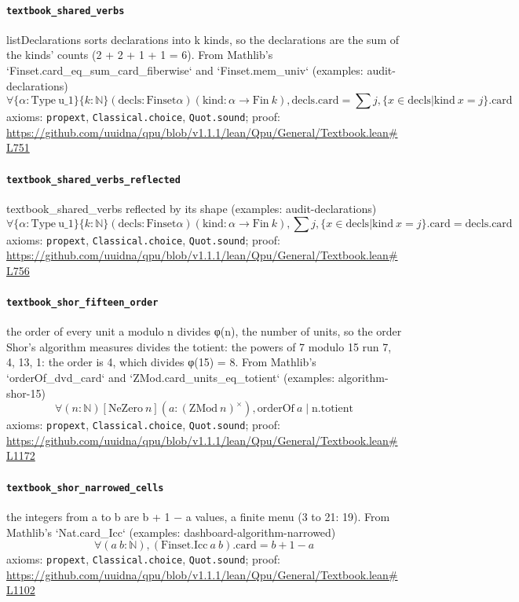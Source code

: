 \documentclass[11pt]{article}
\begin{document}
\paragraph{\texttt{textbook\_shared\_verbs}}
listDeclarations sorts declarations into k kinds, so the declarations are the sum of the kinds' counts (2 + 2 + 1 + 1 = 6). From Mathlib's `Finset.card\_eq\_sum\_card\_fiberwise` and `Finset.mem\_univ` (examples: audit-declarations)
\[ \forall \{\alpha : \mathrm{Type}\ \mathrm{u\_1}\} \{k : \mathbb{N}\} (\mathrm{decls} : \mathrm{Finset} \alpha ) (\mathrm{kind} : \alpha \to \mathrm{Fin}\ k), \mathrm{decls.card} = \sum j, \{x \in \mathrm{decls} | \mathrm{kind}\ x = j\}\mathrm{.card} \]
\noindent axioms: \texttt{propext}, \texttt{Classical.choice}, \texttt{Quot.sound}; proof: \url{https://github.com/uuidna/qpu/blob/v1.1.1/lean/Qpu/General/Textbook.lean\#L751}

\paragraph{\texttt{textbook\_shared\_verbs\_reflected}}
textbook\_shared\_verbs reflected by its shape (examples: audit-declarations)
\[ \forall \{\alpha : \mathrm{Type}\ \mathrm{u\_1}\} \{k : \mathbb{N}\} (\mathrm{decls} : \mathrm{Finset} \alpha ) (\mathrm{kind} : \alpha \to \mathrm{Fin}\ k), \sum j, \{x \in \mathrm{decls} | \mathrm{kind}\ x = j\}\mathrm{.card} = \mathrm{decls.card} \]
\noindent axioms: \texttt{propext}, \texttt{Classical.choice}, \texttt{Quot.sound}; proof: \url{https://github.com/uuidna/qpu/blob/v1.1.1/lean/Qpu/General/Textbook.lean\#L756}

\paragraph{\texttt{textbook\_shor\_fifteen\_order}}
the order of every unit a modulo n divides φ(n), the number of units, so the order Shor's algorithm measures divides the totient: the powers of 7 modulo 15 run 7, 4, 13, 1: the order is 4, which divides φ(15) = 8. From Mathlib's `orderOf\_dvd\_card` and `ZMod.card\_units\_eq\_totient` (examples: algorithm-shor-15)
\[ \forall (n : \mathbb{N}) [\mathrm{NeZero}\ n] (a : (\mathrm{ZMod}\ n)^{\times}), \mathrm{orderOf}\ a \mid \mathrm{n.totient} \]
\noindent axioms: \texttt{propext}, \texttt{Classical.choice}, \texttt{Quot.sound}; proof: \url{https://github.com/uuidna/qpu/blob/v1.1.1/lean/Qpu/General/Textbook.lean\#L1172}

\paragraph{\texttt{textbook\_shor\_narrowed\_cells}}
the integers from a to b are b + 1 − a values, a finite menu (3 to 21: 19). From Mathlib's `Nat.card\_Icc` (examples: dashboard-algorithm-narrowed)
\[ \forall (a\ b : \mathbb{N}), (\mathrm{Finset.Icc}\ a\ b)\mathrm{.card} = b + 1 - a \]
\noindent axioms: \texttt{propext}, \texttt{Classical.choice}, \texttt{Quot.sound}; proof: \url{https://github.com/uuidna/qpu/blob/v1.1.1/lean/Qpu/General/Textbook.lean\#L1102}
\end{document}
